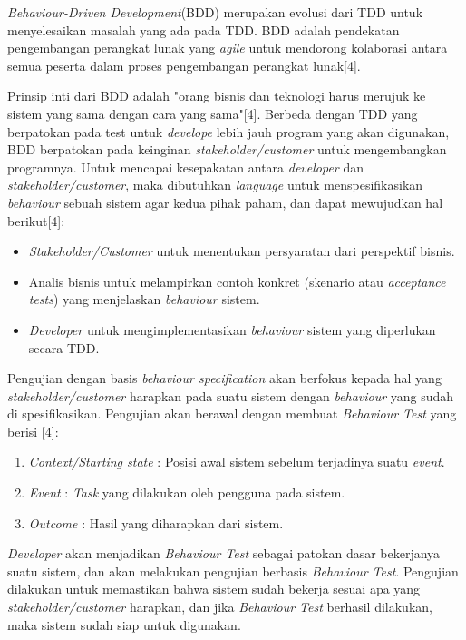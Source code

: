 \textit{Behaviour-Driven Development}(BDD) merupakan evolusi dari TDD untuk menyelesaikan masalah yang ada pada TDD. BDD adalah pendekatan pengembangan perangkat lunak yang \textit{agile} untuk mendorong kolaborasi antara semua peserta dalam proses pengembangan perangkat lunak[4].

Prinsip inti dari BDD adalah "orang bisnis dan teknologi harus merujuk ke sistem yang sama dengan cara yang sama"[4]. Berbeda dengan TDD yang berpatokan pada test untuk \textit{develope} lebih jauh program yang akan digunakan, BDD berpatokan pada keinginan \textit{stakeholder/customer} untuk mengembangkan programnya. Untuk mencapai kesepakatan antara \textit{developer} dan \textit{stakeholder/customer}, maka dibutuhkan \textit{language} untuk menspesifikasikan \textit{behaviour} sebuah sistem agar kedua pihak paham, dan dapat mewujudkan hal berikut[4]:
\begin{itemize}
\item \textit{Stakeholder/Customer} untuk menentukan persyaratan dari perspektif bisnis.
\item Analis bisnis untuk melampirkan contoh konkret (skenario atau \textit{acceptance tests}) yang menjelaskan \textit{behaviour} sistem.
\item \textit{Developer} untuk mengimplementasikan \textit{behaviour} sistem yang diperlukan secara TDD.
\end{itemize}
	
Pengujian dengan basis \textit{behaviour specification} akan berfokus kepada hal yang \textit{stakeholder/customer} harapkan pada suatu sistem dengan \textit{behaviour} yang sudah di spesifikasikan. Pengujian akan berawal dengan membuat \textit{Behaviour Test} yang berisi [4]:
\begin{enumerate}
\item \textit{Context/Starting state} : Posisi awal sistem sebelum terjadinya suatu \textit{event}.
\item \textit{Event} : \textit{Task} yang dilakukan oleh pengguna pada sistem.
\item \textit{Outcome} : Hasil yang diharapkan dari sistem.
\end{enumerate}
\textit{Developer} akan menjadikan \textit{Behaviour Test} sebagai patokan dasar bekerjanya suatu sistem, dan akan melakukan pengujian berbasis \textit{Behaviour Test}. Pengujian dilakukan untuk memastikan bahwa sistem sudah bekerja sesuai apa yang \textit{stakeholder/customer} harapkan, dan jika \textit{Behaviour Test} berhasil dilakukan, maka sistem sudah siap untuk digunakan. 
